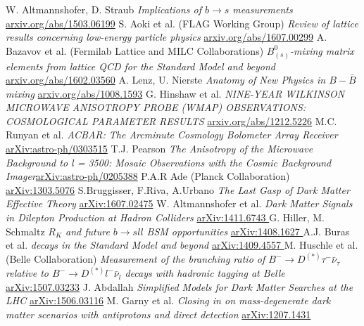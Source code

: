 \begin{thebibliography}{xxx}
 W. Altmannshofer, D. Straub \textit{Implications of $b\rightarrow s$ measurements} \href{https://arxiv.org/abs/1503.06199}{arxiv.org/abs/1503.06199}
 S. Aoki et al. (FLAG Working Group) \textit{Review of lattice results concerning low-energy particle physics} \href{https://arxiv.org/abs/1607.00299}{arxiv.org/abs/1607.00299}
 A. Bazavov et al. (Fermilab Lattice and MILC Collaborations) \textit{$B^0_{(s)}$-mixing matrix elements from lattice QCD for the Standard Model and beyond} \href{https://arxiv.org/abs/1602.03560}{arxiv.org/abs/1602.03560}
 A. Lenz, U. Nierste \textit{Anatomy of New Physics in $B-\bar B$ mixing} \href{https://arxiv.org/abs/1008.1593}{arxiv.org/abs/1008.1593}
 G. Hinshaw et al. \textit{NINE-YEAR WILKINSON MICROWAVE ANISOTROPY PROBE (WMAP) OBSERVATIONS: COSMOLOGICAL PARAMETER RESULTS}  \href{https://arxiv.org/abs/1212.5226}{arxiv.org/abs/1212.5226}
 M.C. Runyan et al. \textit{ACBAR: The Arcminute Cosmology Bolometer Array Receiver} \href{https://arxiv.org/abs/astro-ph/0303515}{arXiv:astro-ph/0303515}
 T.J. Pearson \textit{The Anisotropy of the Microwave Background to l = 3500: Mosaic Observations with the Cosmic Background Imager}\href{https://arxiv.org/abs/astro-ph/0205388}{arXiv:astro-ph/0205388}
 P.A.R Ade (Planck Collaboration) \href{https://arxiv.org/abs/1303.5076}{arXiv:1303.5076}
 S.Bruggisser, F.Riva, A.Urbano \textit{The Last Gasp of Dark Matter Effective Theory} \href{https://arxiv.org/abs/1607.02475}{arXiv:1607.02475}
 W. Altmannshofer et al. \textit{Dark Matter Signals in Dilepton Production at Hadron Colliders} \href{https://arxiv.org/abs/1411.6743}{arXiv:1411.6743 }
 G. Hiller, M. Schmaltz \textit{$R_K$ and future $b\rightarrow sll$ BSM opportunities} \href{https://arxiv.org/abs/1408.1627}{arXiv:1408.1627 }
 A.J. Buras et al. \textit{decays in the Standard Model and beyond} \href{https://arxiv.org/abs/1409.4557}{arXiv:1409.4557 }
 M. Huschle et al. (Belle Collaboration) \textit{Measurement of the branching ratio of $B^-\rightarrow D^{(*)}\tau^-\bar \nu_\tau$ relative to $B^-\rightarrow D^{(*)}l^-\bar \nu_l$ decays with hadronic tagging at Belle} \href{https://arxiv.org/abs/1507.03233}{arXiv:1507.03233}
 J. Abdallah \textit{Simplified Models for Dark Matter Searches at the LHC} \href{https://arxiv.org/abs/1506.03116}{arXiv:1506.03116}
 M. Garny et al. \textit{Closing in on mass-degenerate dark matter scenarios with antiprotons and direct detection} \href{https://arxiv.org/abs/1207.1431}{arXiv:1207.1431}

\end{thebibliography}
